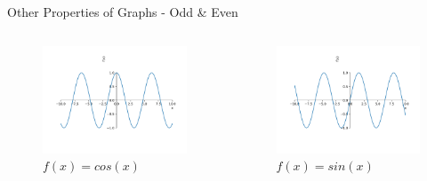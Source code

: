 \documentclass[10pt]{beamer}
\begin{document}
\begin{frame}{Other Properties of Graphs - Odd \& Even}
  \begin{columns}
    \begin{column}{0.5\textwidth}
      \begin{figure}
        \includegraphics[width=\textwidth]{beamer-pics/even.pdf}
        \caption*{$f(x) = cos(x)$}
      \end{figure}
    \end{column}

    \begin{column}{0.5\textwidth}
      \begin{figure}
        \includegraphics[width=\textwidth]{beamer-pics/odd.pdf}
        \caption*{$f(x) = sin(x)$}
      \end{figure}
    \end{column}
  \end{columns}
\end{frame}
\end{document}
